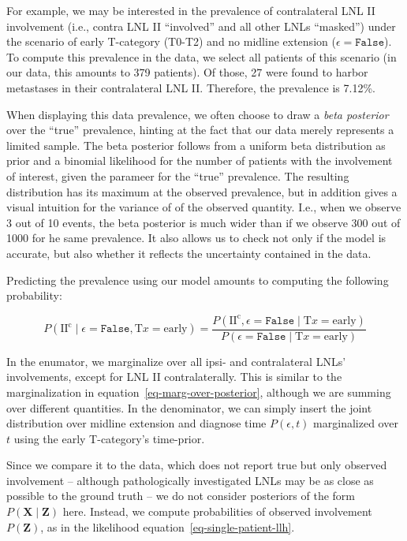 \documentclass[
  sn-mathphys-num,
]{sn-jnl}
\begin{document}
For example, we may be interested in the prevalence of contralateral LNL
II involvement (i.e., contra LNL II ``involved'' and all other LNLs
``masked'') under the scenario of early T-category (T0-T2) and no
midline extension (\(\epsilon=\texttt{False}\)). To compute this
prevalence in the data, we select all patients of this scenario (in our
data, this amounts to 379 patients). Of those, 27 were found to harbor
metastases in their contralateral LNL II. Therefore, the prevalence is
7.12\%.

When displaying this data prevalence, we often choose to draw a
\emph{beta posterior} over the ``true'' prevalence, hinting at the fact
that our data merely represents a limited sample. The beta posterior
follows from a uniform beta distribution as prior and a binomial
likelihood for the number of patients with the involvement of interest,
given the parameer for the ``true'' prevalence. The resulting
distribution has its maximum at the observed prevalence, but in addition
gives a visual intuition for the variance of of the observed quantity.
I.e., when we observe 3 out of 10 events, the beta posterior is much
wider than if we observe 300 out of 1000 for he same prevalence. It also
allows us to check not only if the model is accurate, but also whether
it reflects the uncertainty contained in the data.

Predicting the prevalence using our model amounts to computing the
following probability:

\[
P \left( \text{II}^\text{c} \mid \epsilon=\texttt{False}, \text{T}x=\text{early} \right) = \frac{P \left( \text{II}^\text{c}, \epsilon=\texttt{False} \mid \text{T}x=\text{early} \right)}{P \left( \epsilon=\texttt{False} \mid \text{T}x=\text{early} \right)}
\]

In the enumator, we marginalize over all ipsi- and contralateral LNLs'
involvements, except for LNL II contralaterally. This is similar to the
marginalization in equation~\ref{eq-marg-over-posterior}, although we
are summing over different quantities. In the denominator, we can simply
insert the joint distribution over midline extension and diagnose time
\(P \left( \epsilon, t \right)\) marginalized over \(t\) using the early
T-category's time-prior.

Since we compare it to the data, which does not report true but only
observed involvement -- although pathologically investigated LNLs may be
as close as possible to the ground truth -- we do not consider
posteriors of the form \(P \left( \mathbf{X} \mid \mathbf{Z} \right)\)
here. Instead, we compute probabilities of observed involvement
\(P \left( \mathbf{Z} \right)\), as in the likelihood
equation~\ref{eq-single-patient-llh}.
\end{document}

